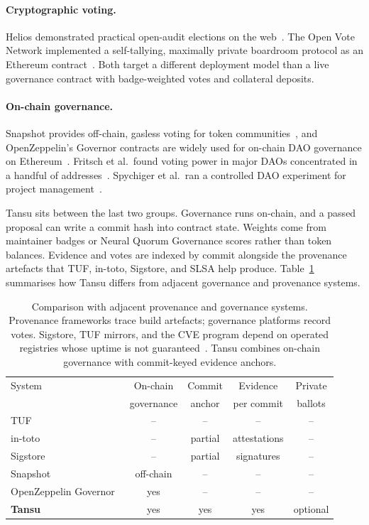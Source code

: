 \documentclass[11pt]{article}
\newcommand{\tansu}{Tansu}
\begin{document}
\paragraph{Cryptographic voting.}
Helios demonstrated practical open-audit elections on the
web~\citep{adida2008helios}. The Open Vote Network implemented a
self-tallying, maximally private boardroom protocol as an Ethereum
contract~\citep{mccorry2017smart}. Both target a different deployment model
than a live governance contract with badge-weighted votes and collateral
deposits.

\paragraph{On-chain governance.}
Snapshot provides off-chain, gasless voting for token
communities~\citep{snapshot}, and OpenZeppelin's Governor contracts are widely
used for on-chain DAO governance on
Ethereum~\citep{openzeppelin_governor}. Fritsch et al.\ found voting power in
major DAOs concentrated in a handful of
addresses~\citep{fritsch2024dao}. Spychiger et al.\ ran a controlled DAO
experiment for project management~\citep{spychiger2023dapo}.

\tansu{} sits between the last two groups. Governance runs on-chain, and a
passed proposal can write a commit hash into contract state. Weights come from
maintainer badges or Neural Quorum Governance scores rather than token
balances. Evidence and votes are indexed by commit alongside the provenance
artefacts that TUF, in-toto, Sigstore, and SLSA help produce. Table~\ref{tab:comparison}
summarises how \tansu{} differs from adjacent governance and provenance systems.

\begin{table}[t]
\centering
\caption{Comparison with adjacent provenance and governance systems. Provenance
frameworks trace build artefacts; governance platforms record votes. Sigstore,
TUF mirrors, and the CVE program depend on operated registries whose uptime is
not guaranteed~\citep{sigstore_rekor,mitre_cve_funding2025}. \tansu{}
combines on-chain governance with commit-keyed evidence anchors.}
\label{tab:comparison}
\small
\begin{tabular}{@{}lcccc@{}}
\toprule
System & On-chain & Commit & Evidence & Private \\
       & governance & anchor & per commit & ballots \\
\midrule
TUF~\citep{tuf} & -- & -- & -- & -- \\
in-toto~\citep{in_toto} & -- & partial & attestations & -- \\
Sigstore~\citep{newman2022sigstore} & -- & partial & signatures & -- \\
Snapshot~\citep{snapshot} & off-chain & -- & -- & -- \\
OpenZeppelin Governor~\citep{openzeppelin_governor} & yes & -- & -- & -- \\
\textbf{\tansu{}} & yes & yes & yes & optional \\
\bottomrule
\end{tabular}
\end{table}
\end{document}

